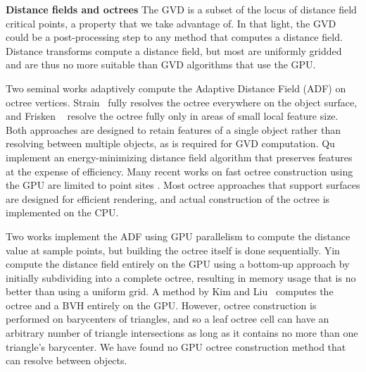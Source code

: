 \documentclass{egpubl}
\renewcommand{\paragraph}[1]{\noindent \textbf{#1}}
\begin{document}
\paragraph{Distance fields and octrees}
The GVD is a subset of the locus of distance field critical points, a property that we take advantage of. In that light, the GVD could be a post-processing step to any method that computes a distance field.  Distance transforms compute a distance field, but most are uniformly gridded \cite{jones20063d} and are thus no more suitable than GVD algorithms that use the GPU.

Two seminal works adaptively compute the Adaptive Distance Field (ADF) on octree vertices.  Strain~ fully resolves the octree everywhere on the object surface, and Frisken \etal~ resolve the octree fully only in areas of small local feature size.  Both approaches are designed to retain features of a single object rather than resolving between multiple objects, as is required for GVD computation.  Qu \etal {} implement an energy-minimizing distance field algorithm that preserves features at the expense of efficiency.  Many recent works on fast octree construction using the GPU are limited to point sites \cite{bedorf2012sparse,karras2012maximizing,zhou2011data}. Most octree approaches that support surfaces \cite{baert2013out,crassin2009gigavoxels,laine2011efficient,lefebvre2007compressed} are designed for efficient rendering, and actual construction of the octree is implemented on the CPU.

Two works \cite{bastos2008gpu,park2010cuda} implement the ADF using GPU parallelism to compute the distance value at sample points, but building the octree itself is done sequentially.  Yin \etal~ compute the distance field entirely on the GPU using a bottom-up approach by initially subdividing into a complete octree, resulting in memory usage that is no better than using a uniform grid.  A method by Kim and Liu~ computes the octree and a BVH entirely on the GPU. However, octree construction is performed on barycenters of triangles, and so a leaf octree cell can have an arbitrary number of triangle intersections as long as it contains no more than one triangle's barycenter.  We have found no GPU octree construction method that can resolve between objects.
\end{document}
